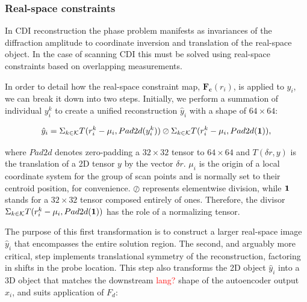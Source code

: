 \documentclass[sn-mathphys]{sn-jnl}%
\theoremstyle{thmstyleone}%
\theoremstyle{thmstyletwo}%
\theoremstyle{thmstylethree}%
\begin{document}
\subsubsection{Real-space constraints}
In CDI reconstruction the phase problem manifests as invariances of the diffraction amplitude to coordinate inversion and translation of the real-space object. In the case of scanning CDI this must be solved using real-space constraints based on overlapping measurements.

In order to detail how the real-space constraint map, $\mathbf{F_c}(r_i)$, is applied to $y_i$, we can break it down into two steps. Initially, we perform a summation of individual $y_i^k$ to create a unified reconstruction $\hat{y}_i$ with a shape of $64 \times 64$:
%


\begin{equation} 
\hat{y}_i = \Sigma_{k \in \mathcal{K}} T(r_i^k - \mu_i, Pad2d(y_i^k))
\oslash
\Sigma_{k \in \mathcal{K}} T(r_i^k - \mu_i, Pad2d(\bf{1})), 
\label{eq:1}
\end{equation}

where $Pad2d$ denotes zero-padding a $32 \times 32$ tensor to $64 \times 64$ and $T(\delta r, y)$ is the translation of a 2D tensor $y$ by the vector $\delta r$. $\mu_i$ is the origin of a local coordinate system for the group of scan points and is normally set to their centroid position, for convenience. $\oslash$ represents elementwise division, while $\bf{1}$ stands for a $32 \times 32$ tensor composed entirely of ones. Therefore, the divisor $\Sigma_{k \in \mathcal{K}} T(r_i^k - \mu_i, Pad2d(\bf{1}))$ has the role of a normalizing tensor.

The purpose of this first transformation is to construct a larger real-space image $\hat{y}_i$ that encompasses the entire solution region. The second, and arguably more critical, step implements translational symmetry of the reconstruction, factoring in shifts in the probe location. This step also transforms the 2D object $\hat{y}_i$ into a 3D object that matches the downstream \textcolor{red}{lang?} shape of the autoencoder output $x_i$, and suits application of $F_d$:
\end{document}
